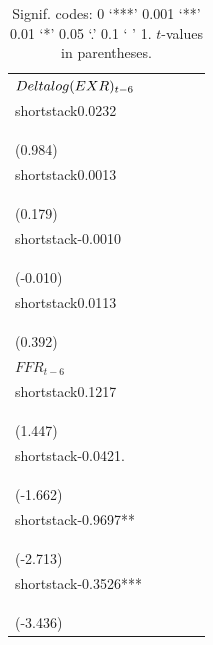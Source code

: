 \begin{table}[H]
\begin{tabular}{l c c c c}
$\\Delta\\log(EXR)_{t-6}$ & \\shortstack{0.0232\\\\(0.984)} & \\shortstack{0.0013\\\\(0.179)} & \\shortstack{-0.0010\\\\(-0.010)} & \\shortstack{0.0113\\\\(0.392)} \\
$FFR_{t-6}$ & \\shortstack{0.1217\\\\(1.447)} & \\shortstack{-0.0421.\\\\(-1.662)} & \\shortstack{-0.9697**\\\\(-2.713)} & \\shortstack{-0.3526***\\\\(-3.436)} \\
\hline
\end{tabular}
\vspace{0.5em}
\caption*{\footnotesize Signif. codes: 0 ‘***’ 0.001 ‘**’ 0.01 ‘*’ 0.05 ‘.’ 0.1 ‘ ’ 1. $t$-values in parentheses.}
\end{table}

